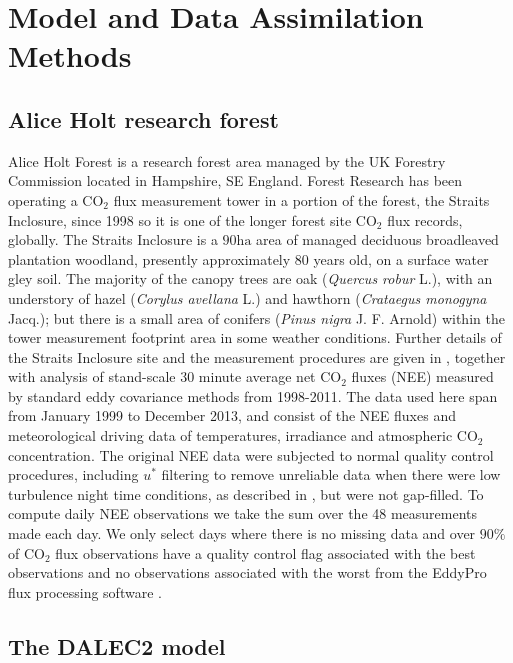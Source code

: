 \section{Model and Data Assimilation Methods}

\subsection{Alice Holt research forest}

Alice Holt Forest is a research forest area managed by the UK Forestry Commission located in Hampshire, SE England. Forest Research has been operating a $\text{CO}_{2}$ flux measurement tower in a portion of the forest, the Straits Inclosure, since 1998 so it is one of the longer forest site $\text{CO}_2$ flux records, globally. The Straits Inclosure is a $90 \text{ha}$ area of managed deciduous broadleaved plantation woodland, presently approximately $80$ years old, on a surface water gley soil. The majority of the canopy trees are oak (\textit{Quercus robur} L.), with an understory of hazel (\textit{Corylus avellana} L.) and hawthorn (\textit{Crataegus monogyna} Jacq.); but there is a small area of conifers (\textit{Pinus nigra} J. F. Arnold) within the tower measurement footprint area in some weather conditions. Further details of the Straits Inclosure site and the measurement procedures are given in \citet{wilkinson2012inter}, together with analysis of stand-scale $30$ minute average net $\text{CO}_{2}$ fluxes (NEE) measured by standard eddy covariance methods from 1998-2011. The data used here span from January 1999 to December 2013, and consist of the NEE fluxes and meteorological driving data of temperatures, irradiance and atmospheric $\text{CO}_2$ concentration. The original NEE data were subjected to normal quality control procedures, including $u^{*}$ filtering to remove unreliable data when there were low turbulence night time conditions, as described in \citet{wilkinson2012inter}, but were not gap-filled. To compute daily NEE observations we take the sum over the 48 measurements made each day. We only select days where there is no missing data and over $90\% $ of $\text{CO}_2$ flux observations have a quality control flag associated with the best observations and no observations associated with the worst from the EddyPro flux processing software \citep{eddypro}.

\subsection{The DALEC2 model}

